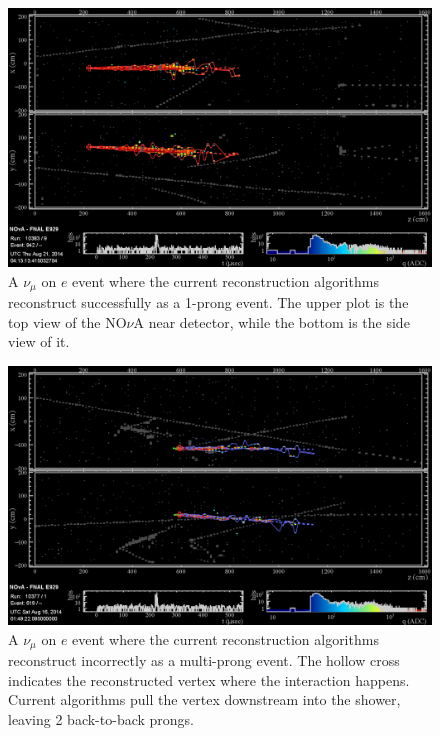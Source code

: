 \documentclass[12pt,a4paper,final]{iopart}
\begin{document}
\begin{figure}
  \centering
  \includegraphics[width=\textwidth]{figures/nelastic1npng3d1.eps}
  \caption{A $\nu_\mu$ on $e$ event where the current reconstruction algorithms reconstruct successfully as a 1-prong event. The upper plot is the top view of the NO$\nu$A near detector, while the bottom is the side view of it.}
  \label{fig:oneprong}
\end{figure}

\begin{figure}
  \centering
  \includegraphics[width=\textwidth]{figures/nelastic1npng3d1+.eps}
  \caption{A $\nu_\mu$ on $e$ event where the current reconstruction algorithms reconstruct incorrectly as a multi-prong event. The hollow cross indicates the reconstructed vertex where the interaction happens. Current algorithms pull the vertex downstream into the shower, leaving 2 back-to-back prongs.}
  \label{fig:multiprong}
\end{figure}

%
%
\end{document}
